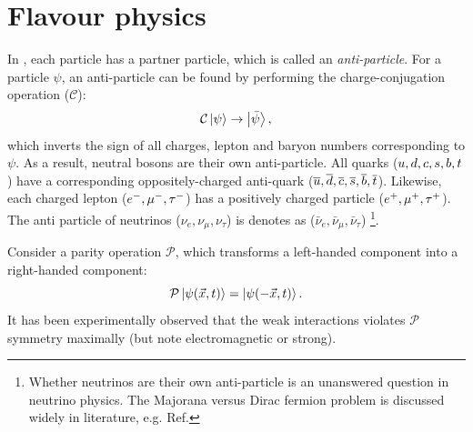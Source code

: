 \section{Flavour physics}\label{sec:flavour_physics}

In \SM, each particle has a partner particle, which is called an \textit{anti-particle}.
For a particle $\psi$, an anti-particle can be found by performing the charge-conjugation operation ($\mathcal{C}$):
\begin{equation}
    \mathcal{C}\ket{\psi}\rightarrow\ket{\bar{\psi}},
\end{equation}
which inverts the sign of all charges, lepton and baryon numbers corresponding to $\psi$.
As a result, neutral bosons are their own anti-particle.
All quarks ($u,d,c,s,b,t$) have a corresponding oppositely-charged anti-quark ($\overline u,\overline d,\overline c,\overline s,\overline b,\overline t$).
Likewise, each charged lepton ($e^-,\mu^{-},\tau^-$) has a positively charged particle ($e^+,\mu^+,\tau^+$).
The anti particle of neutrinos ($\nu_{e},\nu_{\mu},\nu_{\tau}$) is denotes as ($\bar{\nu}_{e},\bar{\nu}_{\mu},\bar{\nu}_{\tau}$)
\footnote{Whether neutrinos are their own anti-particle is an unanswered question in neutrino physics. 
The Majorana versus Dirac fermion problem is discussed widely in literature, e.g. Ref\cite{Bilenky:2020vjk}.
}.

Consider a parity operation $\mathcal{P}$, which transforms a left-handed component into a right-handed component:
\begin{equation}
    \mathcal{P}\ket{\psi(\vec{x},t)} = \ket{\psi(-\vec{x},t)}.
\end{equation}
It has been experimentally observed that the weak interactions violates $\mathcal{P}$ symmetry maximally (but note electromagnetic or strong).


